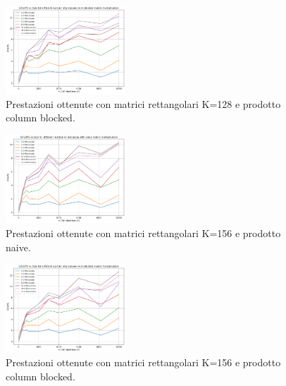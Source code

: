 \documentclass[conference]{IEEEtran}
\begin{document}
\begin{figure}[H]
    \centering
    \includegraphics[width=0.4\textwidth]{resources/rettangolari_k128_blocked.png}
    \caption{Prestazioni ottenute con matrici rettangolari K=128 e prodotto column blocked.}
    \label{fig:rect_k128_matrix_blocked}
\end{figure}
\begin{figure}[H]
    \centering
    \includegraphics[width=0.4\textwidth]{resources/rettangolari_k156_naive.png}
    \caption{Prestazioni ottenute con matrici rettangolari K=156 e prodotto naive.}
    \label{fig:rect_k156_matrix_naive}
\end{figure}
\begin{figure}[H]
    \centering
    \includegraphics[width=0.4\textwidth]{resources/rettangolari_k156_blocked.png}
    \caption{Prestazioni ottenute con matrici rettangolari K=156 e prodotto column blocked.}
    \label{fig:rect_k156_matrix_blocked}
\end{figure}
\end{document}
